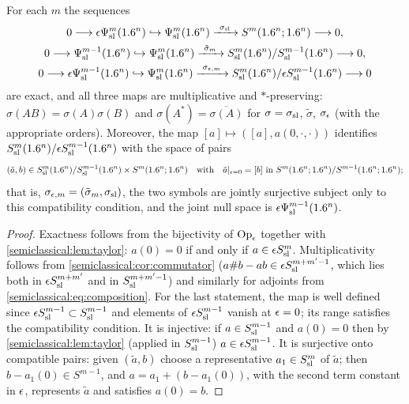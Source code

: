 \begin{proposition}\label{semiclassical:prop:symbol-maps}
  For each $m$ the sequences
  \begin{gather*}
    0\longrightarrow\epsilon\Psi^{m}_{\mathrm{sl}}(1.6^n)\hookrightarrow\Psi^{m}_{\mathrm{sl}}(1.6^n)\xrightarrow{\ \sigma_{\mathrm{sl}}\ }S^m(1.6^n;1.6^n)\longrightarrow0,\\
    0\longrightarrow\Psi^{m-1}_{\mathrm{sl}}(1.6^n)\hookrightarrow\Psi^{m}_{\mathrm{sl}}(1.6^n)\xrightarrow{\ \tilde\sigma_m\ }
      S^{m}_{\mathrm{sl}}(1.6^n)/S^{m-1}_{\mathrm{sl}}(1.6^n)\longrightarrow0,\\
    0\longrightarrow\epsilon\Psi^{m-1}_{\mathrm{sl}}(1.6^n)\hookrightarrow\Psi^{m}_{\mathrm{sl}}(1.6^n)\xrightarrow{\ \sigma_{\epsilon,m}\ }
      S^{m}_{\mathrm{sl}}(1.6^n)/\epsilon S^{m-1}_{\mathrm{sl}}(1.6^n)\longrightarrow0
  \end{gather*}
  are exact, and all three maps are multiplicative and $*$-preserving:
  $\sigma(AB)=\sigma(A)\sigma(B)$ and $\sigma(A^*)=\overline{\sigma(A)}$ for
  $\sigma=\sigma_{\mathrm{sl}}$, $\tilde\sigma$, $\sigma_\epsilon$ (with the appropriate orders).
  Moreover, the map $[a]\mapsto([a],a(0,\cdot,\cdot))$ identifies
  $S^{m}_{\mathrm{sl}}(1.6^n)/\epsilon S^{m-1}_{\mathrm{sl}}(1.6^n)$ with the space of pairs
  \begin{equation*}
    (\tilde a,b)\in S^{m}_{\mathrm{sl}}(1.6^n)/S^{m-1}_{\mathrm{sl}}(1.6^n)\times S^m(1.6^n;1.6^n)\quad\text{with}\quad
    \tilde a|_{\epsilon=0}=[b]\ \text{in }S^m(1.6^n;1.6^n)/S^{m-1}(1.6^n;1.6^n);
  \end{equation*}
  that is, $\sigma_{\epsilon,m}=(\tilde\sigma_m,\sigma_{\mathrm{sl}})$, the two symbols are jointly
  surjective subject only to this compatibility condition, and the joint null
  space is $\epsilon\Psi^{m-1}_{\mathrm{sl}}(1.6^n)$.
\end{proposition}
\begin{proof}
  Exactness follows from the bijectivity of $\operatorname{Op}_\epsilon$ together with
  \cref{semiclassical:lem:taylor}: $a(0)=0$ if and only if $a\in\epsilon S^{m}_{\mathrm{sl}}$.
  Multiplicativity follows from \cref{semiclassical:cor:commutator}
  ($a\#b-ab\in\epsilon S^{m+m'-1}_{\mathrm{sl}}$, which lies both in $\epsilon S^{m+m'}_{\mathrm{sl}}$ and in
  $S^{m+m'-1}_{\mathrm{sl}}$) and similarly for adjoints from
  \eqref{semiclassical:eq:composition}. For the last statement, the map is well
  defined since $\epsilon S^{m-1}_{\mathrm{sl}}\subset S^{m-1}_{\mathrm{sl}}$ and elements of $\epsilon S^{m-1}_{\mathrm{sl}}$
  vanish at $\epsilon=0$; its range satisfies the compatibility condition. It is
  injective: if $a\in S^{m-1}_{\mathrm{sl}}$ and $a(0)=0$ then by
  \cref{semiclassical:lem:taylor} (applied in $S^{m-1}_{\mathrm{sl}}$) $a\in\epsilon S^{m-1}_{\mathrm{sl}}$.
  It is surjective onto compatible pairs: given $(\tilde a,b)$ choose a
  representative $a_1\in S^{m}_{\mathrm{sl}}$ of $\tilde a$; then $b-a_1(0)\in S^{m-1}$, and
  $a=a_1+(b-a_1(0))$, with the second term constant in $\epsilon$, represents
  $\tilde a$ and satisfies $a(0)=b$.
\end{proof}

